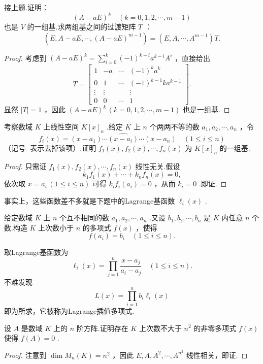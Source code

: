 \begin{prob}[15]
	接上题.证明：
	\[
		(A-aE)^k\quad(k=0,1,2,\cdots,m-1)
	\]
	也是 $V$ 的一组基.求两组基之间的过渡矩阵 $T$ ：
	\[
		(E,A-aE,\cdots,(A-aE)^{m-1})=(E,A,\cdots,A^{m-1})T.
	\]
\end{prob}
\begin{proof}
	考虑到 $(A-aE)^k=\displaystyle \sum_{i=0}^{k}(-1)^{k-i}a^{k-i}A^i$ ，直接给出
	\[
		T=\begin{bmatrix}
			1      & -a     & \cdots & (-1)^ka^k          \\
			0      & 1      & \cdots & (-1)^{k-1}ka^{k-1} \\
			\vdots & \vdots &        & \vdots             \\
			0      & 0      & \cdots & 1
		\end{bmatrix}.
	\]
	显然 $|T|=1$ ，因此 $(A-aE)^k\,(k=0,1,2,\cdots,m-1)$ 也是一组基.
\end{proof}
\begin{prob}[18]
	考察数域 $K$ 上线性空间 $K[x]_n$ .给定 $K$ 上 $n$ 个两两不等的数 $a_1,a_2,\cdots,a_n$ ，令
	\[
		f_i(x)=(x-a_1)\cdots\widehat{(x-a_i)}\cdots(x-a_n)\quad(1\le i\le n)
	\]
	（记号 $\widehat{}$ 表示去掉该项）.证明 $f_1(x),f_2(x),\cdots,f_n(x)$ 为 $K[x]_n$ 的一组基.
\end{prob}
\begin{proof}
	只需证 $f_1(x),f_2(x),\cdots,f_n(x)$ 线性无关.假设
	\[
		k_1f_1(x)+\cdots+k_nf_n(x)=0,
	\]
	依次取 $x=a_i\,(1\le i\le n)$ 可得 $k_if_i(a_i)=0$ ，从而 $k_i=0$ .即证.
\end{proof}
\begin{note}
	事实上，这些函数差不多就是下题中的Lagrange基函数 $\ell_i(x)$ .
\end{note}
\begin{prob}[19]
	给定数域 $K$ 上 $n$ 个互不相同的数 $a_1,a_2,\cdots,a_n$ .又设 $b_1,b_2,\cdots,b_n$ 是 $K$ 内任意 $n$ 个数.构造 $K$ 上次数小于 $n$ 的多项式 $f(x)$ ，使得
	\[
		f(a_i)=b_i\quad(1\le i\le n).
	\]
\end{prob}
\begin{sol}
	取Lagrange基函数为
	\[
		\ell_i(x)=\prod_{j=1}^{n}\frac{x-a_j}{a_i-a_j}\quad(1\le i\le n).
	\]
	不难发现
	\[
		L(x)=\prod_{i=1}^{n}b_i\ell_i(x)
	\]
	即为所求，它被称为Lagrange插值多项式.
\end{sol}
\begin{prob}[20]
	设 $A$ 是数域 $K$ 上的 $n$ 阶方阵.证明存在 $K$ 上次数不大于 $n^2$ 的非零多项式 $f(x)$ 使得 $f(A)=0$ .
\end{prob}
\begin{proof}
	注意到 $\dim M_n(K)=n^2$ ，因此 $E,A,A^2,\cdots,A^{n^2}$ 线性相关，即证.
\end{proof}
